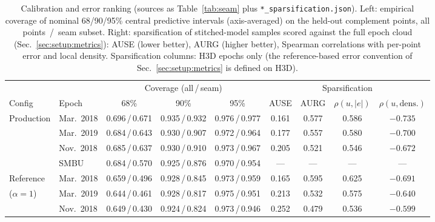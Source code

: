 \begin{table}[!t]
\caption{Calibration and error ranking (sources as
Table~\ref{tab:seam} plus \texttt{*\_sparsification.json}). Left:
empirical coverage of nominal 68/90/95\% central predictive intervals
(axis-averaged) on the held-out complement points, all
points~/~seam subset. Right: sparsification of stitched-model samples
scored against the full epoch cloud (Sec.~\ref{sec:setup:metrics}):
AUSE (lower better), AURG (higher better), Spearman correlations with
per-point error and local density. Sparsification columns: H3D epochs
only (the reference-based error convention of
Sec.~\ref{sec:setup:metrics} is defined on H3D).}
\label{tab:coverage}
\centering
\begin{tabular}{llccccccc}
\hline
 & & \multicolumn{3}{c}{Coverage (all\,/\,seam)} &
\multicolumn{4}{c}{Sparsification} \\
Config & Epoch & 68\% & 90\% & 95\% & AUSE & AURG & $\rho(u,|e|)$ &
$\rho(u,\mathrm{dens.})$ \\
\hline
Production & Mar.\ 2018 & 0.696\,/\,0.671 & 0.935\,/\,0.932 & 0.976\,/\,0.977 & 0.161 & 0.577 & 0.586 & $-0.735$ \\
           & Mar.\ 2019 & 0.684\,/\,0.643 & 0.930\,/\,0.907 & 0.972\,/\,0.964 & 0.177 & 0.557 & 0.580 & $-0.700$ \\
           & Nov.\ 2018 & 0.685\,/\,0.637 & 0.930\,/\,0.910 & 0.973\,/\,0.967 & 0.205 & 0.521 & 0.546 & $-0.672$ \\
           & SMBU       & 0.684\,/\,0.570 & 0.925\,/\,0.876 & 0.970\,/\,0.954 &---&---&---&---\\
\hline
Reference  & Mar.\ 2018 & 0.659\,/\,0.496 & 0.928\,/\,0.845 & 0.973\,/\,0.959 & 0.165 & 0.595 & 0.625 & $-0.691$ \\
($\alpha=1$) & Mar.\ 2019 & 0.644\,/\,0.461 & 0.928\,/\,0.817 & 0.975\,/\,0.951 & 0.213 & 0.532 & 0.575 & $-0.640$ \\
           & Nov.\ 2018 & 0.649\,/\,0.430 & 0.924\,/\,0.824 & 0.973\,/\,0.946 & 0.252 & 0.479 & 0.536 & $-0.599$ \\
\hline
\end{tabular}
\end{table}

